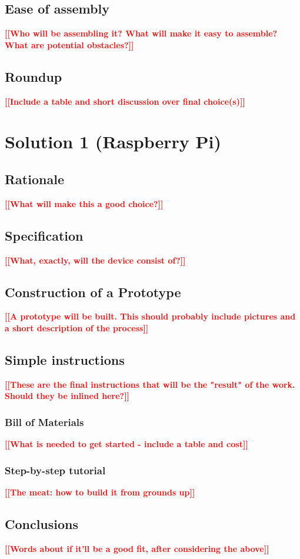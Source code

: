 \documentclass[thesis=B,english,hidelinks]{template/FITthesisXE}
\newcommand{\todo}[1]{\textcolor{red}{\textbf{[[#1]]}}}
\newcommand{\blind}[1][1]{
    \textcolor{gray}{\Blindtext[#1][1]}
}
\begin{document}
    \section{Ease of assembly}
        \todo{Who will be assembling it?  What will make it easy to assemble?  What are potential obstacles?}
        \blind[2]
    \section{Roundup}
        \todo{Include a table and short discussion over final choice(s)}
        \blind[2]
\chapter{Solution 1 (Raspberry Pi)}
    \section{Rationale}
        \todo{What will make this a good choice?}
        \blind[2]
    \section{Specification}
        \todo{What, exactly, will the device consist of?}
        \blind[3]
    \section{Construction of a Prototype}
        \todo{A prototype will be built.  This should probably include pictures and a short description of the process}
        \blind[3]
    \section{Simple instructions}
        \todo{These are the final instructions that will be the "result" of the work.  Should they be inlined here?}
        \subsection{Bill of Materials}
            \todo{What is needed to get started - include a table and cost}
            \blind[3]
        \subsection{Step-by-step tutorial}
            \todo{The meat: how to build it from grounds up}
            \blind[4]
    \section{Conclusions}
        \todo{Words about if it'll be a good fit, after considering the above}
        \blind[2]
\end{document}

